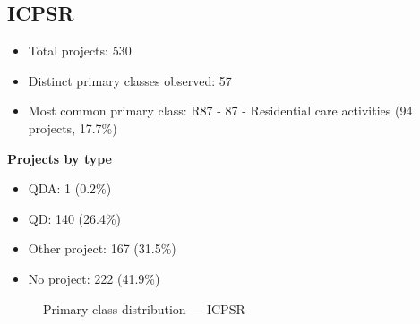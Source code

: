 \subsection{ICPSR}

\begin{itemize}
    \item Total projects: 530
    \item Distinct primary classes observed: 57
    \item Most common primary class: R87 - 87 - Residential care activities (94 projects, 17.7\%)
\end{itemize}
\textbf{Projects by type}
\begin{itemize}
    \item QDA: 1 (0.2\%)
    \item QD: 140 (26.4\%)
    \item Other project: 167 (31.5\%)
    \item No project: 222 (41.9\%)
\end{itemize}

\begin{figure}[h]
    \centering
    
    \caption{Primary class distribution --- ICPSR}
\end{figure}

